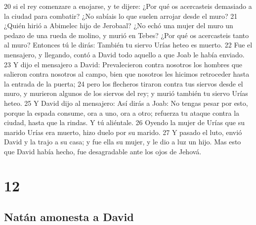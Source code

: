 20 si el rey comenzare a enojarse, y te dijere: ¿Por qué os acercasteis demasiado a la ciudad para combatir? ¿No sabíais lo que suelen arrojar desde el muro?
21 ¿Quién hirió a Abimelec hijo de Jerobaal? ¿No echó una mujer del muro un pedazo de una rueda de molino, y murió en Tebes? ¿Por qué os acercasteis tanto al muro? Entonces tú le dirás: También tu siervo Urías heteo es muerto.
22 Fue el mensajero, y llegando, contó a David todo aquello a que Joab le había enviado.
23 Y dijo el mensajero a David: Prevalecieron contra nosotros los hombres que salieron contra nosotros al campo, bien que nosotros les hicimos retroceder hasta la entrada de la puerta;
24 pero los flecheros tiraron contra tus siervos desde el muro, y murieron algunos de los siervos del rey; y murió también tu siervo Urías heteo.
25 Y David dijo al mensajero: Así dirás a Joab: No tengas pesar por esto, porque la espada consume, ora a uno, ora a otro; refuerza tu ataque contra la ciudad, hasta que la rindas. Y tú aliéntale.
26 Oyendo la mujer de Urías que su marido Urías era muerto, hizo duelo por su marido.
27 Y pasado el luto, envió David y la trajo a su casa; y fue ella su mujer, y le dio a luz un hijo. Mas esto que David había hecho, fue desagradable ante los ojos de Jehová.

\chapter{12}

\section*{Natán amonesta a David}


